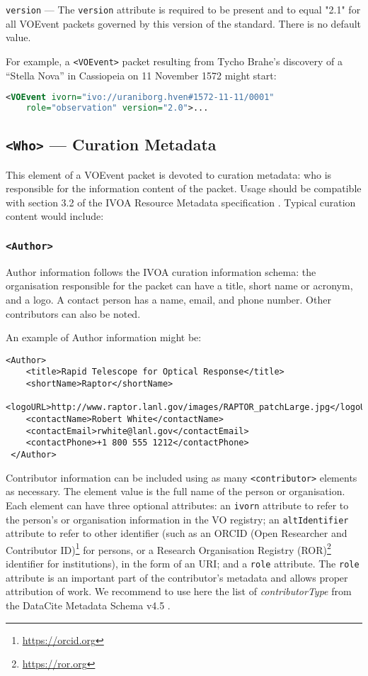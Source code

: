 \documentclass[11pt,a4paper]{ivoa}
\begin{document}
 {\tt version} \label{sec:3.1.3} --- 
The {\tt version} attribute is required to be present and to equal "2.1" for 
all VOEvent packets governed by this version of the standard. There is no 
default value. 

For example, a {\tt <VOEvent>} packet resulting from Tycho Brahe's discovery of 
a ``Stella Nova'' in Cassiopeia on 11 November 1572 might start: 
\begin{lstlisting}[language=XML]
<VOEvent ivorn="ivo://uraniborg.hven#1572-11-11/0001" 
    role="observation" version="2.0">...
\end{lstlisting}

\subsection{{\tt <Who>} --- Curation Metadata}
\label{sec:3.2}
This element of a VOEvent packet is devoted to curation metadata: who is
responsible for the information content of the packet. Usage should be
compatible with section 3.2 of the IVOA Resource Metadata specification
\citep{2007ivoa.spec.0302H}. Typical curation content would include:

\subsubsection{\tt <Author>}
Author information follows the IVOA curation information schema: the
organisation responsible for the packet can have a title, short name or acronym,
and a logo. A contact person has a name, email, and phone number. Other
contributors can also be noted.

An example of Author information might be:
\begin{lstlisting}
<Author>
    <title>Rapid Telescope for Optical Response</title>
    <shortName>Raptor</shortName>
    <logoURL>http://www.raptor.lanl.gov/images/RAPTOR_patchLarge.jpg</logoURL>
    <contactName>Robert White</contactName>
    <contactEmail>rwhite@lanl.gov</contactEmail>
    <contactPhone>+1 800 555 1212</contactPhone>
 </Author>
\end{lstlisting}

Contributor information can be included using as many {\tt <contributor>}
elements as necessary. The element value is the full name of the person or
organisation. Each element can have three optional attributes: an {\tt ivorn}
attribute to refer to the person's or organisation information in the VO
registry; an {\tt altIdentifier} attribute to refer to other identifier (such
as an ORCID (Open Researcher and Contributor ID)\footnote{
\url{https://orcid.org}} for persons, or a Research Organisation Registry 
(ROR)\footnote{\url{https://ror.org}} identifier for institutions), in the form 
of an URI; and a {\tt role} attribute. The {\tt role} attribute is an important 
part of the contributor's metadata and allows proper attribution of work. We 
recommend to use here the list of \emph{contributorType} from the DataCite 
Metadata Schema v4.5 \citep{https://doi.org/10.14454/g8e5-6293}.
\end{document}
